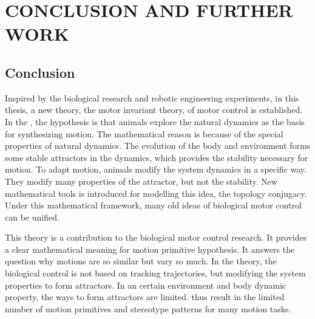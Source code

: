 \def\baselinestretch{1}
\chapter{CONCLUSION AND FURTHER WORK}
\label{chap:con}
\graphicspath{{Conclusions/ConclusionsFigs/EPS/}{Conclusions/ConclusionsFigs/}}


\def\baselinestretch{1.66}

\section{Conclusion}

Inspired by the biological research and robotic engineering experiments, in this thesis, a new theory, the motor invariant theory, of motor control is established.
In the \moit, the hypothesis is that animals explore the natural dynamics as the basis for synthesizing motion.
The mathematical reason is because of the special properties of natural dynamics.
The evolution of the body and environment forms some stable attractors in the dynamics, which provides the stability necessary for motion.
To adapt motion, animals modify the system dynamics in a specific way.
They modify many properties of the attractor, but not the stability.
New mathematical tools is introduced for modelling this idea, the topology conjugacy.
Under this mathematical framework, many old ideas of biological motor control can be unified.


This theory is a contribution to the biological motor control research.
It provides a clear mathematical meaning for  motion primitive hypothesis.
It answers the question why motions are so similar but vary so much.
In the \moit theory, the biological control is not based on tracking trajectories,
but modifying the system properties to form attractors.
In an certain environment and body dynamic property,
the ways to form attractors are limited.
thus result in the limited number of motion primitives and stereotype patterns for many motion tasks.



